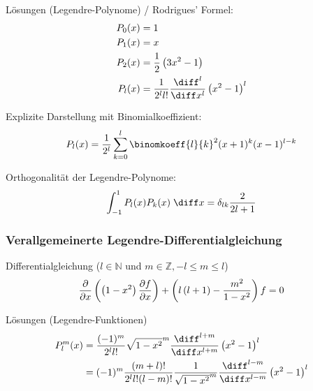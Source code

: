 \documentclass[11pt]{article}
\numberwithin{equation}{section}
\begin{document}
        Lösungen (Legendre-Polynome) / Rodrigues' Formel:
        \begin{equation} \label{eq:legendre-polynome}
          \begin{aligned}
            P_0(x) &= 1 \\
            P_1(x) &= x \\
            P_2(x) &= \frac{1}{2}\left(3x^2-1\right) \\
            P_l(x) &= \frac{1}{2^l l!}\frac{\diff^l}{\diff x^l}\left(x^2-1\right)^l \\
          \end{aligned}
        \end{equation}

        Explizite Darstellung mit Binomialkoeffizient:
        \begin{equation}
          P_l(x)=\frac{1}{2^l} \sum_{k=0}^{l}\binomkoeff{l}{k}^2(x+1)^k(x-1)^{l-k}
        \end{equation}

        Orthogonalität der Legendre-Polynome:
        \begin{equation}
          \int_{-1}^1 P_l(x) P_k(x)\;\diff x = \delta_{lk} \frac{2}{2l+1}
        \end{equation}

      \subsubsection{Verallgemeinerte Legendre-Differentialgleichung}
        Differentialgleichung ($l\in\mathbb{N}$ und $m\in\mathbb{Z}, -l\le m\le l$)
        \begin{equation}
          \frac{\partial }{\partial x}\left(\left(1-x^2\right)\frac{\partial f}{\partial x}\right)+\left(l\left(l+1\right)-\frac{m^2}{1-x^2}\right)f= 0
        \end{equation}

        Lösungen (Legendre-Funktionen)
        \begin{equation}
          \begin{aligned}
            P_l^m(x) &= \frac{(-1)^m}{2^l l!}\sqrt{1-x^2}^m
            \frac{\diff^{l+m}}{\diff x^{l+m}}\left(x^2-1\right)^l \\
            &= (-1)^m \frac{(m+l)!}{2^l l! (l-m)!}\frac{1}{\sqrt{1-x^2}^m}
            \frac{\diff^{l-m}}{\diff x^{l-m}}\left(x^2-1\right)^l \\
          \end{aligned}
        \end{equation}
\end{document}
